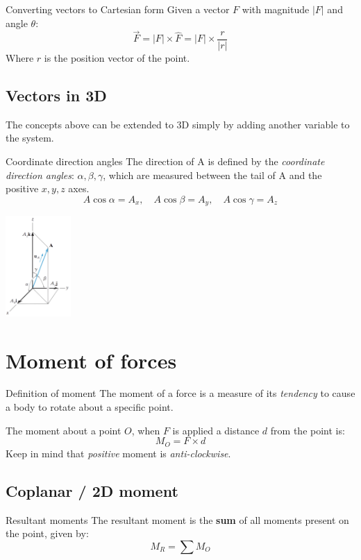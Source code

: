 \begin{definition}
    {Converting vectors to Cartesian form}
    Given a vector $F$ with magnitude $|F|$ and angle $\theta$:
    \[\vec{F}=|F|\times\hat{F}=|F|\times\frac{r}{|r|}\]
    Where $r$ is the position vector of the point.
\end{definition}
\subsection{Vectors in 3D}
The concepts above can be extended to 3D simply by adding another variable to the system.
\begin{theorem}
    {Coordinate direction angles}
    The direction of A is defined by the \emph{coordinate direction angles}: $\alpha, \beta, \gamma$, which are measured between the tail of A and the positive $x, y, z$ axes.
    \[A\cos\alpha=A_x,\quad A\cos\beta=A_y,\quad A\cos\gamma=A_z\]
    \begin{center}
        \includegraphics[width=2.5cm]{img/Ax.png}
    \end{center}
\end{theorem}

\section{Moment of forces}
\begin{definition}
    {Definition of moment}
    The moment of a force is a measure of its \emph{tendency} to cause a body to rotate about a specific point.

    The moment about a point $O$, when $F$ is applied a distance $d$ from the point is:
    \[M_O=F\times d\]
    Keep in mind that \emph{positive} moment is \emph{anti-clockwise}.
\end{definition}
\subsection{Coplanar / 2D moment}
\begin{knBox}
    {Resultant moments}
    The resultant moment is the \textbf{sum} of all moments present on the point, given by:
    \[M_R=\sum M_O\]
\end{knBox}
